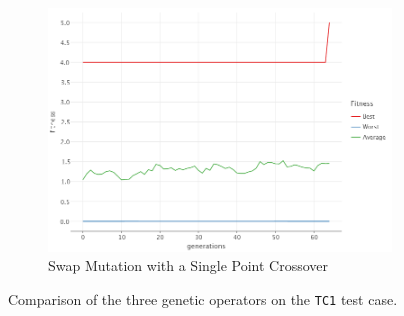 \begin{figure}[ht!]
\begin{subfigure}{0.35\textwidth}
            \includegraphics[width=\textwidth]{img/beacon_sp_swap_1.png}
            \caption{Swap Mutation with a Single Point Crossover}
            \label{fig:beacon:1:swap}
        \end{subfigure}
        \caption{Comparison of the three genetic operators on the \texttt{TC1} test case.}
        \label{fig:beacon:1}
    \end{figure}
    
